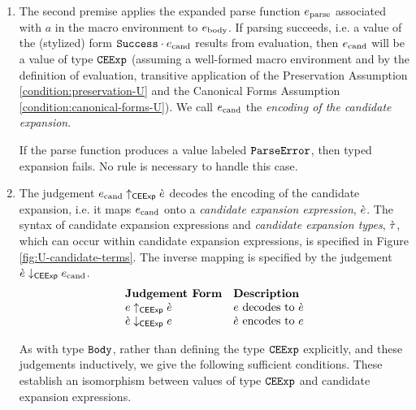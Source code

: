 \begin{enumerate}
\item The second premise applies the expanded parse function $e_\text{parse}$ associated with $a$ in the macro environment to $e_\text{body}$. If parsing succeeds, i.e. a value of the (stylized) form $\mathtt{Success} \cdot e_\text{cand}$ results from evaluation, then $e_\text{cand}$ will be a value of type $\mathtt{CEExp}$ (assuming a well-formed macro environment and by the definition of evaluation, transitive application of the Preservation Assumption \ref{condition:preservation-U} and the Canonical Forms Assumption \ref{condition:canonical-forms-U}). We call $e_\text{cand}$ the \emph{encoding of the candidate expansion}.

If the parse function produces a value labeled $\mathtt{ParseError}$, then typed expansion fails. No rule is necessary to handle this case. 

\item The judgement $e_\text{cand} \uparrow_\mathsf{CEExp} \grave{e}$ decodes the encoding of the candidate expansion, i.e. it maps $e_\text{cand}$ onto a \emph{candidate expansion expression}, $\grave{e}$. The syntax of candidate expansion expressions and \emph{candidate expansion types}, $\grave{\tau}$, which can occur within candidate expansion expressions, is specified in Figure \ref{fig:U-candidate-terms}. The inverse mapping is specified by the judgement $\grave{e} \downarrow_\mathsf{CEExp} e_\text{cand}$. 
\[\begin{array}{ll}
\textbf{Judgement Form} & \textbf{Description}\\
e \uparrow_\mathsf{CEExp} \grave{e} & \text{$e$ decodes to $\grave{e}$}\\
\grave{e} \downarrow_\mathsf{CEExp} e & \text{$\grave{e}$ encodes to $e$}
\end{array}\]

As with type $\mathtt{Body}$, rather than defining the type $\mathtt{CEExp}$ explicitly, and these judgements inductively, we give  the following sufficient conditions. These establish an isomorphism between values of type $\mathtt{CEExp}$ and candidate expansion expressions.


\end{enumerate}
